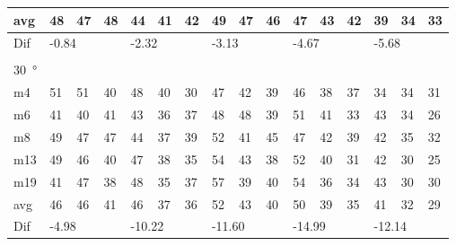 \begin{table}[H]
\begin{tabular}{l|l|l|l|l|l|l|l|l|l|l|l|l|lll}
avg & 48     &  47    &  48    &  44    &  41    &   42   &  49    &  47     & 46     &  47     &  43    &   42   & \multicolumn{1}{l|}{39} & \multicolumn{1}{l|}{34}  &33  \\ \hline  
Dif & \multicolumn{3}{l|}{-0.84} & \multicolumn{3}{l|}{-2.32} & \multicolumn{3}{l|}{-3.13} & \multicolumn{3}{l|}{-4.67} & \multicolumn{3}{l}{-5.68}  \\ 
 \multicolumn{16}{l}{ } \\                         
\SI{30}{\degree}   & \multicolumn{3}{l|}{} & \multicolumn{3}{l|}{} & \multicolumn{3}{l|}{} & \multicolumn{3}{l|}{} & \multicolumn{3}{l}{}   \\  \hline
m4    &  51    &  51    & 40     & 48     &  40    &   30   &   47   &   42    &  39    &   46    &   38   &   37   & \multicolumn{1}{l|}{34} & \multicolumn{1}{l|}{34} & 31 \\
m6    &  41    &   40   &  41    & 43     &   36   &  37    &    48  &   48    &  39    &   51    &   41   &   33   & \multicolumn{1}{l|}{43} & \multicolumn{1}{l|}{34} & 26 \\
m8    &  49    &  47    & 47     &  44    &  37    &   39   &   52   &   41    &  45    &   47    &    42  &   39   & \multicolumn{1}{l|}{42} & \multicolumn{1}{l|}{35} & 32 \\
m13  &   49   & 46     &   40   & 47     &   38   &   35   &   54   &   43    &  38    &   52    &   40   &   31   & \multicolumn{1}{l|}{42} & \multicolumn{1}{l|}{30} & 25 \\
m19  &  41    &  47    &  38    &  48    &  35    &   37   &   57   &    39   &  40    &   54    &   36   &    34  & \multicolumn{1}{l|}{43} & \multicolumn{1}{l|}{30} & 30 \\ \hline
avg &  46    &   46   &  41    &  46    &  37    & 36     &  52    &   43    & 40     &   50    & 39     &   35   & \multicolumn{1}{l|}{41} & \multicolumn{1}{l|}{32}  &29  \\ \hline  
Dif & \multicolumn{3}{l|}{-4.98} & \multicolumn{3}{l|}{-10.22} & \multicolumn{3}{l|}{-11.60} & \multicolumn{3}{l|}{-14.99} & \multicolumn{3}{l}{-12.14}                                
\end{tabular}
\end{table}


